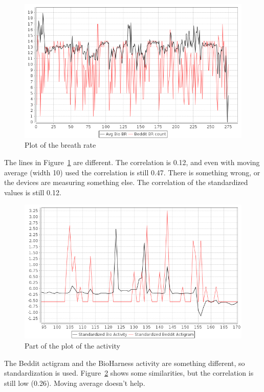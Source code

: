 			\begin{figure}[h]
				\centering
					\includegraphics[scale=0.5]{vsbr.png}
					
				\caption{Plot of the breath rate}
				\label{fig:vsbr}

			\end{figure}

			The lines in Figure~\ref{fig:vsbr} are different. The correlation is 0.12, and even with moving average (width 10) used the correlation is still 0.47. There is something wrong, or the devices are measuring something else. The correlation of the standardized values is still 0.12. 
						
			\begin{figure}[h]
				\centering
					\includegraphics[scale=0.5]{vsactivity.png}
					
				\caption{Part of the plot of the activity}
				\label{fig:vsactivity}

			\end{figure}
			The Beddit actigram and the BioHarness activity are something different, so standardization is used. Figure~\ref{fig:vsactivity} shows some similarities, but the correlation is still low (0.26). Moving average doesn't help. 

